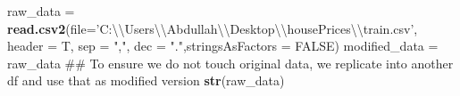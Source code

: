 \documentclass[]{article}
\newenvironment{Shaded}{\begin{snugshade}}{\end{snugshade}}
\newcommand{\KeywordTok}[1]{\textcolor[rgb]{0.13,0.29,0.53}{\textbf{#1}}}
\newcommand{\DataTypeTok}[1]{\textcolor[rgb]{0.13,0.29,0.53}{#1}}
\newcommand{\CharTok}[1]{\textcolor[rgb]{0.31,0.60,0.02}{#1}}
\newcommand{\StringTok}[1]{\textcolor[rgb]{0.31,0.60,0.02}{#1}}
\newcommand{\OtherTok}[1]{\textcolor[rgb]{0.56,0.35,0.01}{#1}}
\newcommand{\NormalTok}[1]{#1}
\begin{document}
\begin{Shaded}
\begin{Highlighting}[]
\NormalTok{raw_data =}\StringTok{ }\KeywordTok{read.csv2}\NormalTok{(}\DataTypeTok{file=}\StringTok{'C:}\CharTok{\textbackslash{}\textbackslash{}}\StringTok{Users}\CharTok{\textbackslash{}\textbackslash{}}\StringTok{Abdullah}\CharTok{\textbackslash{}\textbackslash{}}\StringTok{Desktop}\CharTok{\textbackslash{}\textbackslash{}}\StringTok{housePrices}\CharTok{\textbackslash{}\textbackslash{}}\StringTok{train.csv'}\NormalTok{, }\DataTypeTok{header =}\NormalTok{ T, }\DataTypeTok{sep =} \StringTok{","}\NormalTok{, }\DataTypeTok{dec =} \StringTok{"."}\NormalTok{,}\DataTypeTok{stringsAsFactors =} \OtherTok{FALSE}\NormalTok{)}
\NormalTok{modified_data =}\StringTok{ }\NormalTok{raw_data ## To ensure we do not touch original data, we replicate into another df and use that as modified version}
\KeywordTok{str}\NormalTok{(raw_data)}
\end{Highlighting}
\end{Shaded}
\end{document}
